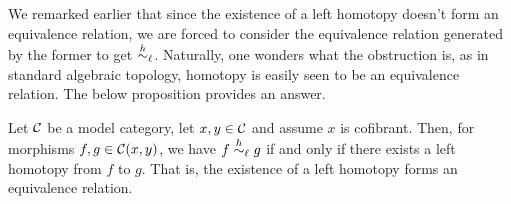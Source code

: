 We remarked earlier that since the existence of a left homotopy doesn't form an equivalence relation, we are forced to consider the equivalence relation generated by the former
to get \(\overset{h}{\sim}_\ell\). Naturally, one wonders what the obstruction is, as in standard algebraic topology, homotopy is easily seen to be an equivalence relation.
The below proposition provides an answer.

\begin{proposition}\label{prop:model-category-cofibrant-object-left-homotopy-equivalence-relation}
	Let \(\mathcal{C}\) be a model category, let \(x,y\in\mathcal{C}\) and assume \(x\) is cofibrant. Then, for morphisms \(f,g\in\mathcal{C}(x,y)\), we have \(f\overset{h}{\sim}_\ell g\) if and only if there exists a left homotopy
	from \(f\) to \(g\). That is, the existence of a left homotopy forms an equivalence relation.
\end{proposition}
